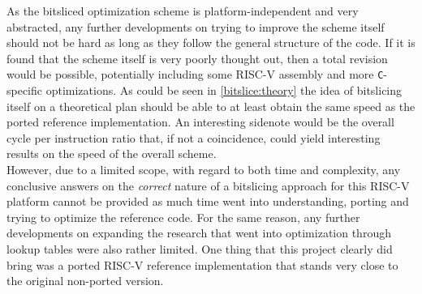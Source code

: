 As the bitsliced optimization scheme is platform-independent and very abstracted, any further developments on trying to improve the scheme itself should not be hard as long as they follow the general structure of the code. If it is found that the scheme itself is very poorly thought out, then a total revision would be possible, potentially including some RISC-V assembly and more \texttt{C}-specific optimizations. As could be seen in \cref{bitslice:theory} the idea of bitslicing itself on a theoretical plan should be able to at least obtain the same speed as the ported reference implementation. An interesting sidenote would be the overall cycle per instruction ratio that, if not a coincidence, could yield interesting results on the speed of the overall scheme.
\medskip\\
However, due to a limited scope, with regard to both time and complexity, any conclusive answers on the \emph{correct} nature of a bitslicing approach for this RISC-V platform cannot be provided as much time went into understanding, porting and trying to optimize the reference code. For the same reason, any further developments on expanding the research that went into optimization through lookup tables were also rather limited. One thing that this project clearly did bring was a ported RISC-V reference implementation that stands very close to the original non-ported version.